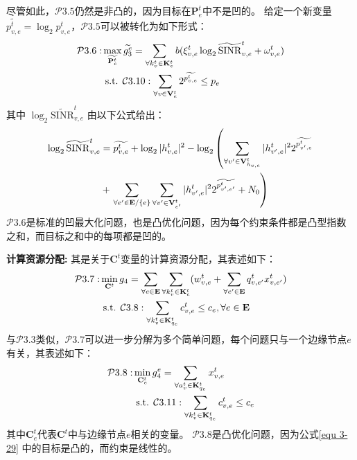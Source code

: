 尽管如此，$\mathcal{P}3.5$仍然是非凸的，因为目标在$\mathbf{P}_{e}^{t}$中不是凹的。
给定一个新变量$\widetilde{p_{v, e}^t} = \log _{2} {p}_{v, e}^t$，$\mathcal{P}3.5$可以被转化为如下形式：
\begin{align}
	\mathcal{P}3.6: & \max_{\widetilde{\mathbf{{P}}_{e}^{t}}}  \widetilde{g_3^{e}}= \sum_{\forall k_{v}^{t} \in \mathbf{K}_{e}^{t}} {b ( \xi_{v, e}^{t} \log _{2}\mathrm{\widetilde{SINR}}_{v, e}^t + \omega_{v, e}^{t} ) } \notag \\
	&\text { s.t. } \mathcal{C}3.10: \sum_{\forall v \in \mathbf{V}_{e}^{t}} 2^{\widetilde{p_{v, e}^t}} \leq p_{e}  
\end{align}
其中 $\log _{2}\mathrm{\widetilde{SINR}}_{v, e}^t$ 由以下公式给出：
\begin{align}
	\log _{2}\mathrm{\widetilde{SINR}}_{v, e}^t &= \widetilde{p_{v, e}^t} + \log _{2} |h_{v, e}^t| ^{2} - \log _{2} \left( \sum\limits_{\forall v^{\prime} \in \mathbf{V}_{h_{v, e}}^{t}} |h_{v^{\prime}, e}^t|^2 2^{\widetilde{p_{v^{\prime}, e}^{t}}} \right. \notag \\
	&+ \left. \sum\limits_{\forall e^{\prime} \in \mathbf{E} / \{e\}} \sum\limits_{\forall v^{\prime} \in \mathbf{V}_{e^{\prime}}^{t}} |h_{v^{\prime}, e}^t|^2 2^{\widetilde{p_{v^{\prime}, e^{\prime}}^{t}}} + N_{0}\right)
\end{align}
\noindent $\mathcal{P}3.6$是标准的凹最大化问题，也是凸优化问题，因为每个约束条件都是凸型指数之和，而目标之和中的每项都是凹的。

\textbf{计算资源分配:} 其是关于$\mathbf{C}^{t}$变量的计算资源分配，其表述如下：
\begin{align}
	\mathcal{P}3.7: &\min_{\mathbf{C}^{t}} g_4= \sum_{ \forall e \in \mathbf{E}} \sum_{\forall k_{v}^{t} \in \mathbf{K}_{e}^{t}} ( w_{v, e}^{t} + \sum_{\forall e^{\prime} \in \mathbf{E}} q_{v, e^{\prime}}^{t} x_{v, e^{\prime}}^t) \notag \\
	&\text { s.t. } \mathcal{C}3.8:  \sum_{\forall k_{v}^{t} \in {\mathbf{K}_{q_e}^{t} }} c_{v, e}^t \leq c_{e}, \forall e \in \mathbf{E}
\end{align}
与$\mathcal{P}3.3$类似，$\mathcal{P}3.7$可以进一步分解为多个简单问题，每个问题只与一个边缘节点$e$有关，其表述如下：
\begin{align}
	\mathcal{P}3.8: &\min_{\mathbf{C}_{e}^{t}} g_4^e= \sum_{\forall a_{v}^{t} \in {\mathbf{K}_{q_e}^{t} }}   x_{v, e}^t \notag \\
	&\text { s.t. } \mathcal{C}3.11:  \sum_{\forall k_{v}^{t} \in {\mathbf{K}_{q_e}^{t} }} {c_{v, e}^t} \leq c_{e}
\label{equ 3-29}
\end{align}
\noindent 其中${\mathbf{C}_e^t}$代表${\mathbf{C}^{t}}$中与边缘节点$e$相关的变量。
$\mathcal{P}3.8$是凸优化问题，因为公式\ref{equ 3-29} 中的目标是凸的，而约束是线性的。

